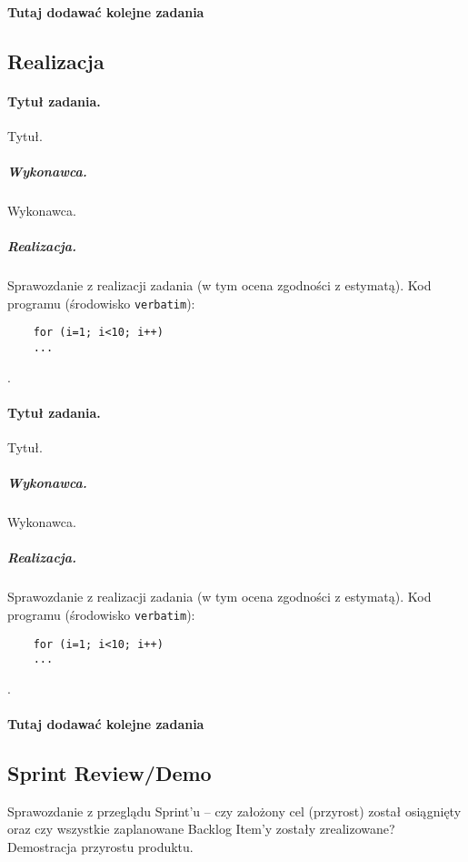 	\paragraph{Tutaj dodawać kolejne zadania}
	
	\subsection{Realizacja}
	
	\paragraph{Tytuł zadania.} Tytuł.
	\subparagraph{Wykonawca.} Wykonawca.
	\subparagraph{Realizacja.} Sprawozdanie z realizacji zadania (w tym ocena zgodności z estymatą). Kod programu (środowisko \texttt{verbatim}): \begin{verbatim}
	for (i=1; i<10; i++)
	...
	\end{verbatim}.
	
	\paragraph{Tytuł zadania.} Tytuł.
	\subparagraph{Wykonawca.} Wykonawca.
	\subparagraph{Realizacja.} Sprawozdanie z realizacji zadania (w tym ocena zgodności z estymatą). Kod programu (środowisko \texttt{verbatim}): \begin{verbatim}
	for (i=1; i<10; i++)
	...
	\end{verbatim}.
	
	\paragraph{Tutaj dodawać kolejne zadania}
	
	
	\subsection{Sprint Review/Demo}
	Sprawozdanie z przeglądu Sprint'u -- czy założony cel (przyrost) został osiągnięty oraz czy wszystkie zaplanowane Backlog Item'y zostały zrealizowane? Demostracja przyrostu produktu.
	